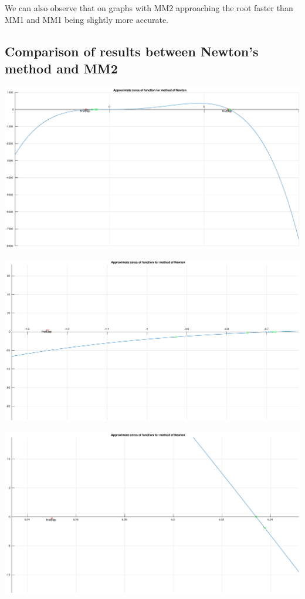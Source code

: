 \documentclass[12pt]{report}
\begin{document}
We can also observe that on graphs with MM2 approaching the root faster than MM1 and MM1 being slightly more accurate.
\subsection{Comparison of results between Newton's method and MM2}

\begin{center}
   \includegraphics[scale=0.25]{task2newtonoverall.eps}
\end{center}

\begin{center}
   \includegraphics[scale=0.25]{task2newtonleft.eps}
\end{center}

\begin{center}
   \includegraphics[scale=0.25]{task2newtonright.eps}
\end{center}
\end{document}
